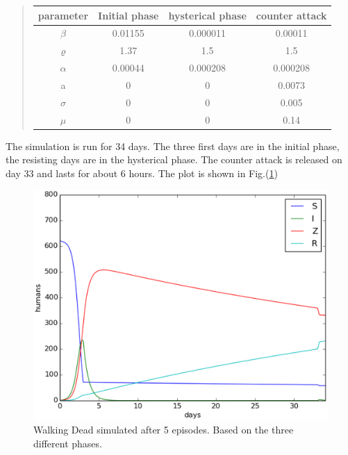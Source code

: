 \documentclass[%
twoside,                 %
final,                   %
10pt]{article}
\begin{document}
\begin{quote}
\begin{tabular}{cccc}
\hline
\multicolumn{1}{c}{ parameter } & \multicolumn{1}{c}{ Initial phase } & \multicolumn{1}{c}{ hysterical phase } & \multicolumn{1}{c}{ counter attack } \\
\hline
$\beta$   & 0.01155       & 0.000011         & 0.00011        \\
$\varrho$ & 1.37          & 1.5              & 1.5            \\
$\alpha$  & 0.00044       & 0.000208         & 0.000208       \\
a         & 0             & 0                & 0.0073         \\
$\sigma$  & 0             & 0                & 0.005          \\
$\mu$     & 0             & 0                & 0.14           \\
\hline
\end{tabular}
\end{quote}

\noindent
The simulation is run for 34 days. The three first days are in the initial phase, the resisting days are in the hysterical phase. The counter attack is released on day 33 and lasts for about 6 hours. The plot is shown in Fig.(\ref{fig:all_phases})   


\begin{figure}[ht]
  \centerline{\includegraphics[width=0.9\linewidth]{plots/WD_zombie_all_phases_1.eps}}
  \caption{
  \label{fig:all_phases} Walking Dead simulated after 5 episodes. Based on the three different phases.
  }
\end{figure}
\end{document}
